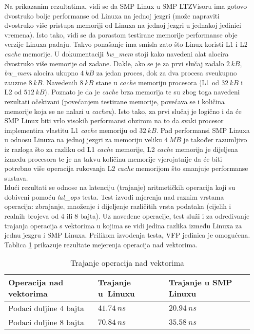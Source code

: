 \documentclass[times, utf8, diplomski, numeric]{fer}
\begin{document}
Na prikazanim rezultatima, vidi se da SMP Linux u SMP LTZVisoru ima gotovo dvostruko bolje performanse od Linuxa na
jednoj jezgri (može napraviti dvostruko više pristupa memoriji od Linuxa na jednoj jezgri u jednakoj jedinici vremena).
Isto tako, vidi se da porastom testirane memorije performanse obje verzije Linuxa padaju. Takvo ponašanje ima smisla zato
što Linux koristi L1 i L2 \textit{cache} memorije. U dokumentaciji \textit{bw\_mem} stoji kako navedeni alat alocira
dvostruko više memorije od zadane. Dakle, ako se je za prvi slučaj zadalo $2~kB$, \textit{bw\_mem} alocira ukupno $4~kB$
za jedan proces, dok za dva procesa sveukupno zauzme $8~kB$. Navedenih $8~kB$ stane u \textit{cache} memoriju procesora
(L1 od $32~kB$ i L2 od $512~kB$). Poznato je da je \textit{cache} brza memorija te su zbog toga navedeni rezultati
očekivani (povećanjem testirane memorije, povećava se i količina memorije koja se ne nalazi u \textit{cacheu}). Isto tako,
za prvi slučaj je logično i da će SMP Linux biti vrlo visokih performansi obzirom na to da svaki procesor implementira
vlastitu L1 \textit{cache} memoriju od $32~kB$. Pad performansi SMP Linuxa u odnosu Linuxa na jednoj jezgri za memoriju
veliku $4~MB$ je također razumljivo iz razloga što za razliku od L1 \textit{cache} memorije, L2 \textit{cache} memorija
je dijeljena između procesora te je na takvu količinu memorije vjerojatnije da će biti potrebno više operacija rukovanja
L2 \textit{cache} memorijom što smanjuje performanse sustava.\\
Idući rezultati se odnose na latenciju (trajanje) aritmetičkih operacija koji su dobiveni pomoću \textit{lat\_ops}
testa. Test izvodi mjerenja nad raznim vrstama operacija: zbrajanje, množenje i dijeljenje različitih vrsta podataka
(cijelih i realnih brojeva od 4 ili 8 bajta). Uz navedene operacije, test služi i za određivanje trajanja operacija
s vektorima u kojima se vidi jedina razlika između Linuxa za jednu jezgru i SMP Linuxa. Prilikom izvođenja testa,
VFP jedinica je omogućena. Tablica \ref{vect_ops} prikazuje rezultate mejerenja operacija nad vektorima.

\begin{table}[H]
  \centering
  \caption{Trajanje operacija nad vektorima}
  \label{vect_ops}
  \begin{tabular}{|| p{6cm} | p{3cm} | p{3cm} ||}
    \hline
    \textbf{Operacija nad vektorima} & \textbf{Trajanje u~Linuxu} & \textbf{Trajanje u SMP Linuxu} \\
    \hline\hline
    Podaci duljine 4 bajta & $41.74~ns$ & $20.94~ns$\\
    \hline
    Podaci duljine 8 bajta & $70.84~ns$ & $35.58~ns$\\
    \hline
  \end{tabular}
\end{table}
\end{document}
